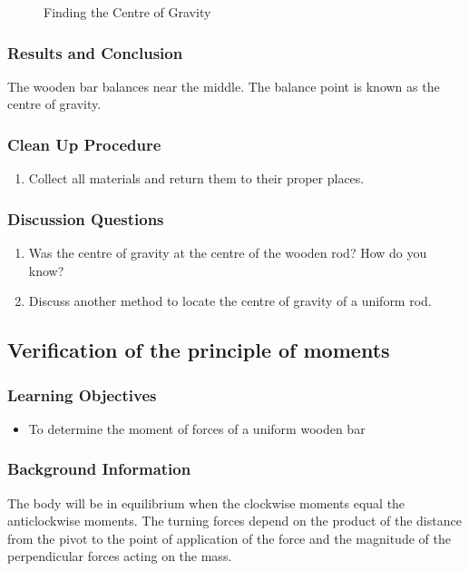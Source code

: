 \begin{figure}
\begin{center}
\def\svgwidth{175pt}

\caption{Finding the Centre of Gravity}
\label{fig:center-of-gravity}
\end{center}
\end{figure}

\subsubsection*{Results and Conclusion}
The wooden bar balances near the middle. The balance point is known as the centre of gravity.  

\subsubsection*{Clean Up Procedure}
\begin{enumerate}
\item{Collect all materials and return them to their proper places.} 
\end{enumerate}

\subsubsection*{Discussion Questions}
\begin{enumerate}
\item{Was the centre of gravity at the centre of the wooden rod? How do you know?}
\item{Discuss another method to locate the centre of gravity of a uniform rod.} 
\end{enumerate}

\subsection{Verification of the principle of moments}

\subsubsection*{Learning Objectives}
\begin{itemize}
\item{To determine the moment of forces of a uniform wooden bar}
\end{itemize}

\subsubsection*{Background Information}
The body will be in equilibrium when the clockwise moments equal the anticlockwise moments. The turning forces depend on the product of the distance from the pivot to the point of application of the force and the magnitude of the perpendicular forces acting on the mass.  

